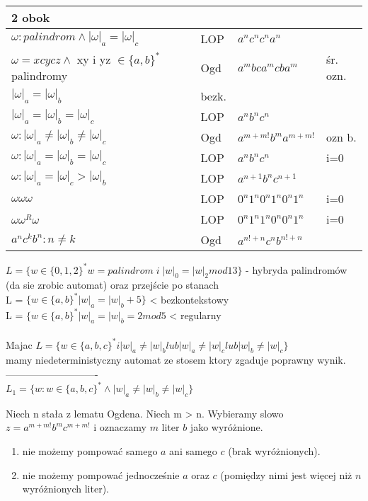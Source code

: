 \begin{tabular}{l|l|l|l}
    2 obok & \\
  \hline
    $\omega:palindrom \wedge |\omega|_{a} = |\omega|_{c} $ & LOP & 
    $a^{n}c^{n}c^{n}a^{n}$ \\
  \hline
    $\omega = xcycz \wedge$ xy i yz $\in \lbrace a,b \rbrace ^{*}$palindromy & Ogd & $a^{m}bca^{m}cba^{m}$ & śr. ozn. \\
  \hline
    $|\omega|_{a} = |\omega|_{b}$ & bezk. & \\
  \hline
    $|\omega|_{a} = |\omega|_{b}= |\omega|_{c}$ & LOP & $a^{n}b^{n}c^{n}$ & \\
  \hline
    $\omega : |\omega|_{a} \neq |\omega|_{b} \neq |\omega|_{c}$ & Ogd & $a^{m+m!}b^{m}a^{m+m!}$ & ozn b.\\
  \hline 
    $\omega : |\omega|_{a} = |\omega|_{b} = |\omega|_{c}$ & LOP & $a^{n}b^{n}c^{n}$ & i=0\\
  \hline
    $\omega : |\omega|_{a} = |\omega|_{c} > |\omega|_{b}$ & LOP & $a^{n+1}b^{n}c^{n+1}$ &\\
  \hline
    $\omega\omega\omega$ & LOP & $0^{n}1^{n}0^{n}1^{n}0^{n}1^{n}$ & i=0\\
  \hline
    $\omega\omega^{R}\omega$ & LOP & $0^{n}1^{n}1^{n}0^{n}0^{n}1^{n}$ & i=0\\
  \hline
    $a^{n}c^{k}b^{n} : n \neq k$ & Ogd & $a^{n!+n}c^{n}b^{n!+n}$& \\
\end{tabular}

$ L = \{ w \in \{0, 1, 2 \}^* w = palindrom \; i \; |w|_0 = |w|_2 mod 13\} $ - hybryda palindromów (da sie zrobic automat) oraz przejście po stanach \\
L = $ \{ w \in \{a, b \}^* |w|_a = |w|_b + 5 \} $ < bezkontekstowy \\
L = $ \{ w \in \{a, b \}^* |w|_a = |w|_b = 2 mod 5 $ < regularny \\
\\

Majac $ L = \{ w \in \{a, b, c\}^* i |w|_a \neq |w|_b lub |w|_a \neq |w|_c lub |w|_b \neq |w|_c \} $ \\
mamy niedeterministyczny automat ze stosem ktory zgaduje poprawny wynik. \\
----------------------------\\

$L_{1} = \{w: w\in\{a,b,c\}^{*} \wedge |w|_{a} \neq |w|_{b} \neq |w|_{c}\}$
 
 Niech n stała z lematu Ogdena. Niech m > n. Wybieramy slowo $z = a^{m + m!}b^{m}c^{m + m!}$ i oznaczamy $m$ liter $b$ jako wyróżnione.
 \begin{enumerate}
 	\item nie możemy pompować samego $a$ ani samego $c$ (brak wyróżnionych).
 	\item nie możemy pompować jednocześnie $a$ oraz $c$ (pomiędzy nimi jest więcej niż $n$ wyróżnionych liter).
 \end{enumerate}
 
